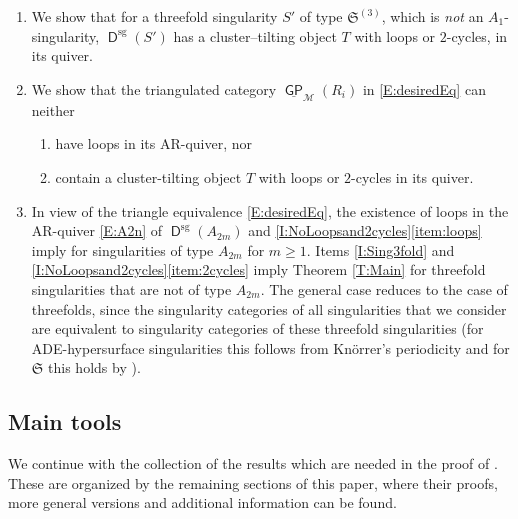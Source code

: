 \documentclass[reqno, 12pt, a4paper, twosided, english]{amsart}
\theoremstyle{plain}
\theoremstyle{definition}
\theoremstyle{remark}
\newtheorem*{Key Statement}{Key Statement}
\newcommand{\GP}{\opname{GP}}
\newcommand{\SMAL}{\mathfrak{S}}
\newcommand{\opname}[1]{\operatorname{\mathsf{#1}}}
\newcommand{\cm}{{\mathcal M}}
\newcommand{\co}{{\mathcal O}}
\newcommand{\cp}{{\mathcal P}}
\newcommand{\Dsg}{\opname{D}^{\mathrm{sg}}}
\begin{document}
\begin{enumerate}[label={(2.\theenumi)},leftmargin=*]
\begin{enumerate}[label={(\alph*)},leftmargin=*]
   Otherwise, by our assumptions, $s$ is an ADE-hypersurface singularity of type $D_{2m+1}$ with $m >1$ or $E_m$ with $m \in \{6,7,8\}$.
   To obtain \eqref{E:desiredEq} from \eqref{E:SingToStabFrob}, we apply Auslander--Solberg reduction on both sides of \eqref{E:SingToStabFrob}: on the left side we change $\Dsg(\smash{\widehat{\co}_s})$ into $\Dsg(S')$ with $S' \in \SMAL$ a singularity of type $A_3$ or $D_4$ and on the right side we change $\underline{\GP}_{\cp}(R_i)$ into $\underline{\GP}_{{\cm}}(R_i)$ with $\cp \subsetneq {\cm}$. 
   \end{enumerate}
   \item \label{I:2.4} \label{I:Sing3fold} We show that for a 
   threefold singularity $S' $ of type $ \SMAL^{(3)}$, which is \emph{not} an $A_{1}$-singularity, $\Dsg(S')$ has a cluster--tilting object $T$ with loops or $2$-cycles, in its quiver.
   \item\label{I:2.5}\label{I:NoLoopsand2cycles} We show that the triangulated category $\underline{\GP}_{{\cm}}(R_i)$ in \eqref{E:desiredEq} can neither
   \begin{enumerate}[label={(\alph*)},leftmargin=*]
        \item have loops in its AR-quiver, nor \label{item:loops}
        \item contain a cluster-tilting object $T$ with loops or $2$-cycles in its quiver.\label{item:2cycles}
   \end{enumerate}
   \item \label{I:2.6} In view of the triangle equivalence \eqref{E:desiredEq}, the existence of loops in the AR-quiver \eqref{E:A2n} of $\Dsg(A_{2m})$ and \ref{I:NoLoopsand2cycles}\ref{item:loops} imply  for singularities of type $A_{2m}$ for $m \geq 1$.
   Items \ref{I:Sing3fold} and \ref{I:NoLoopsand2cycles}\ref{item:2cycles} imply Theorem \ref{T:Main} for threefold singularities that are not of type $A_{2m}$. The general case reduces to the case of threefolds, since the singularity categories of all singularities that we consider are equivalent to singularity categories of these threefold singularities (for ADE-hypersurface singularities this follows from Knörrer's periodicity \cite{Knoerrer} and for $\SMAL$ this holds by ).
   \end{enumerate}

\subsection{Main tools}\label{sec:auxiliary}  We continue with the collection of the results which are needed in the proof of . These are organized by the remaining sections of this paper, where their proofs, more general versions and additional information can be found.
\end{document}
